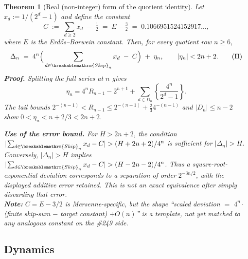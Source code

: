 \documentclass[11pt]{article}
\theoremstyle{plain}
\newtheorem{thm}{Theorem}[section]
\theoremstyle{definition}
\theoremstyle{remark}
\renewcommand{\mathrm}[1]{\ifmmode\breakablemathrm{#1}\else\textrm{#1}\fi}%
\begin{document}
\begin{thm}[Real (non-integer) form of the quotient identity]
\label{thm:real-form}
Let $x_d := 1/(2^d-1)$ and define the constant
\[
C \;:=\; \sum_{d \ge 2} x_d \;-\; \tfrac12 \;=\; E - \tfrac32 \;=\; 0.1066951524152917\ldots,
\]
where $E$ is the Erd\H{o}s--Borwein constant. Then, for every quotient row $n \ge 6$,
\begin{equation*}
\Delta_n \;=\; 4^n \Big( \sum_{d \in \mathrm{Skip}_n} x_d \;-\; C \Big) \;+\; \eta_n, \qquad
|\eta_n| < 2n+2.
\tag{II}
\end{equation*}
\textbf{Proof.} Splitting the full series at $n$ gives
\[
 \eta_n=4^nR_{n-1}-2^{n+1}
       +\sum_{d\in D_n}\left\{\frac{4^n}{2^d-1}\right\}.
\]
The tail bounds $2^{-(n-1)}<R_{n-1}\le
2^{-(n-1)}+\tfrac23 4^{-(n-1)}$ and $|D_n|\le n-2$ show
$0<\eta_n<n+2/3<2n+2$.

\textbf{Use of the error bound.} For $H>2n+2$, the condition
$|\sum_{d\in\mathrm{Skip}_n}x_d-C|>(H+2n+2)/4^n$ is sufficient
for $|\Delta_n|>H$.  Conversely, $|\Delta_n|>H$ implies
$|\sum_{d\in\mathrm{Skip}_n}x_d-C|>(H-2n-2)/4^n$.
Thus a square-root-exponential deviation corresponds to a separation
of order $2^{-3n/2}$, with the displayed additive error retained.
This is not an exact equivalence after simply discarding that error.\\
\textbf{Note:} $C = E - 3/2$ is Mersenne-specific, but the shape ``scaled deviation $=$
$4^n \cdot$(finite skip-sum $-$ target constant) $+ O(n)$'' is a template, not yet matched to any
analogous constant on the \#249 side.
\end{thm}

\subsection{Dynamics}
\end{document}
